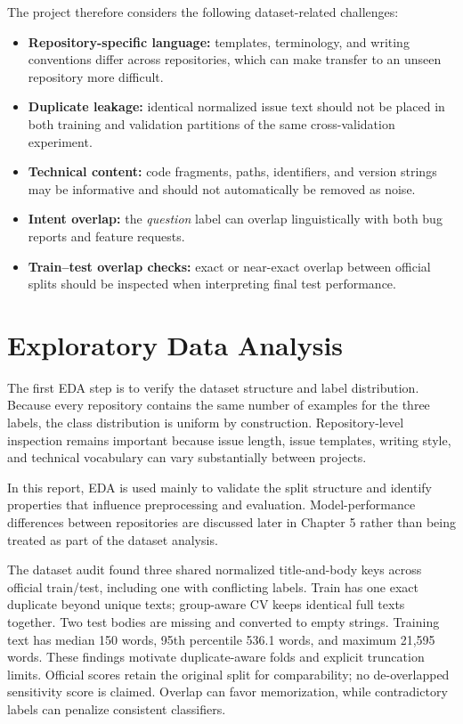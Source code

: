The project therefore considers the following dataset-related challenges:
\begin{itemize}[leftmargin=1.5em]
    \item \textbf{Repository-specific language:} templates, terminology, and writing conventions differ across repositories, which can make transfer to an unseen repository more difficult.
    \item \textbf{Duplicate leakage:} identical normalized issue text should not be placed in both training and validation partitions of the same cross-validation experiment.
    \item \textbf{Technical content:} code fragments, paths, identifiers, and version strings may be informative and should not automatically be removed as noise.
    \item \textbf{Intent overlap:} the \textit{question} label can overlap linguistically with both bug reports and feature requests.
    \item \textbf{Train--test overlap checks:} exact or near-exact overlap between official splits should be inspected when interpreting final test performance.
\end{itemize}

\section{Exploratory Data Analysis}
The first EDA step is to verify the dataset structure and label distribution. Because every repository contains the same number of examples for the three labels, the class distribution is uniform by construction. Repository-level inspection remains important because issue length, issue templates, writing style, and technical vocabulary can vary substantially between projects.

In this report, EDA is used mainly to validate the split structure and identify properties that influence preprocessing and evaluation. Model-performance differences between repositories are discussed later in Chapter 5 rather than being treated as part of the dataset analysis.

The dataset audit found three shared normalized title-and-body keys across official train/test, including one with conflicting labels. Train has one exact duplicate beyond unique texts; group-aware CV keeps identical full texts together. Two test bodies are missing and converted to empty strings. Training text has median 150 words, 95th percentile 536.1 words, and maximum 21,595 words. These findings motivate duplicate-aware folds and explicit truncation limits. Official scores retain the original split for comparability; no de-overlapped sensitivity score is claimed. Overlap can favor memorization, while contradictory labels can penalize consistent classifiers.

